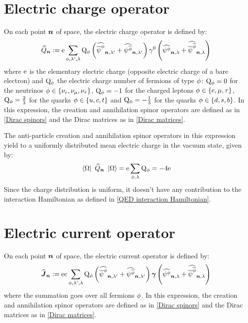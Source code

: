 \documentclass[10pt,a4paper,twoside,openany]{book}
\begin{document}
\section{Electric charge operator}
\label{Electric charge operator}

On each point $\boldsymbol{n}$ of space, the electric charge operator is defined by:
\begin{equation*}
\widehat{Q}_{\boldsymbol{n}} := \mathrm e \sum_{\phi,\lambda',\lambda} \mathrm Q_{\phi} \left( \widehat{\overline \psi^{\phi}}_{{\boldsymbol{n}}, {\lambda'}} + \widehat{\psi^{\overline{\phi}}}_{{\boldsymbol{n}}, {\lambda'}} \right) \gamma^{0} \left( \widehat{\psi^{\phi}}_{{\boldsymbol{n}}, {\lambda}} + \widehat{\overline \psi^{\overline{\phi}}}_{{\boldsymbol{n}}, {\lambda}} \right)
\end{equation*}
where $\mathrm e$ is the elementary electric charge (opposite electric charge of a bare electron) and $\mathrm Q_{\phi}$ the electric charge number of fermions of type $\phi$: $\mathrm Q_{\phi} = 0$ for the neutrinos $\phi \in \{ \nu_{e}, \nu_{\mu}, \nu_{\tau} \}$, $\mathrm Q_{\phi} = -1$ for the charged leptons $\phi \in \{ e, \mu, \tau \}$, $\mathrm Q_{\phi} = \frac 2 3$ for the quarks $\phi \in \{ u, c, t \}$ and $\mathrm Q_{\phi} = - \frac 1 3$ for the quarks $\phi \in \{ d, s, b \}$. In this expression, the creation and annihilation spinor operators are defined as in \ref{Dirac spinors} and the Dirac matrices as in \ref{Dirac matrices}.

The anti-particle creation and annihilation spinor operators in this expression yield to a uniformly distributed mean electric charge in the vacuum state, given by:
\begin{equation*}
\left\langle{\Omega}\right|\  \widehat{Q}_{\boldsymbol{n}} \ \left|{\Omega}\right\rangle = \mathrm e \sum_{\phi,\lambda} \mathrm Q_{\phi} = - 4 \mathrm e
\end{equation*}
Since the charge distribution is uniform, it doesn't have any contribution to the interaction Hamiltonian as defined in \ref{QED interaction Hamiltonian}.

\section{Electric current operator}

On each point $\boldsymbol{n}$ of space, the electric current operator is defined by:
\begin{equation*}
\widehat{\boldsymbol{J}}_{\boldsymbol{n}} := \mathrm e \mathrm c \sum_{\phi,\lambda',\lambda} \mathrm Q_{\phi} \left( \widehat{\overline \psi^{\phi}}_{{\boldsymbol{n}}, {\lambda'}} + \widehat{\psi^{\overline{\phi}}}_{{\boldsymbol{n}}, {\lambda'}} \right) \boldsymbol{\gamma} \left( \widehat{\psi^{\phi}}_{{\boldsymbol{n}}, {\lambda}} + \widehat{\overline \psi^{\overline{\phi}}}_{{\boldsymbol{n}}, {\lambda}} \right)
\end{equation*}
where the summation goes over all fermions $\phi$. In this expression, the creation and annihilation spinor operators are defined as in \ref{Dirac spinors} and the Dirac matrices as in \ref{Dirac matrices}.
\end{document}
